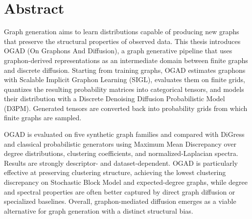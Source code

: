 \chapter*{Abstract}

Graph generation aims to learn distributions capable of producing new graphs
that preserve the structural properties of observed data. This thesis introduces
OGAD (On Graphons And Diffusion), a graph generative pipeline that uses
graphon-derived representations as an intermediate domain between finite graphs
and discrete diffusion. Starting from training graphs, OGAD estimates graphons
with Scalable Implicit Graphon Learning (SIGL), evaluates them on finite grids,
quantizes the resulting probability matrices into categorical tensors, and
models their distribution with a Discrete Denoising Diffusion Probabilistic
Model (D3PM). Generated tensors are converted back into probability grids from
which finite graphs are sampled.

OGAD is evaluated on five synthetic graph families and compared with DiGress
and classical probabilistic generators using Maximum Mean Discrepancy over
degree distributions, clustering coefficients, and normalized-Laplacian
spectra. Results are strongly descriptor- and dataset-dependent. OGAD is
particularly effective at preserving clustering structure, achieving the
lowest clustering discrepancy on Stochastic Block Model and expected-degree
graphs, while degree and spectral properties are often better captured by
direct graph diffusion or specialized baselines. Overall, graphon-mediated
diffusion emerges as a viable alternative for graph generation with a distinct
structural bias.